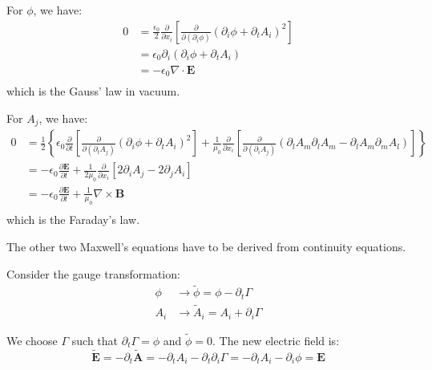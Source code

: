 \documentclass[12pt]{article}
\begin{document}
For $\phi$, we have:
\begin{equation}
    \begin{split}
        0 &= \frac{\epsilon_{0}}{2} \frac{\partial}{\partial x_{i}} \left[ \frac{\partial}{\partial (\partial_{i} \phi)} (\partial_{i} \phi + \partial_{t} A_{i})^{2} \right] \\
        &= \epsilon_{0} \partial_{i} (\partial_{i} \phi + \partial_{t} A_{i}) \\
        &=-\epsilon_{0} \nabla \cdot \mathbf{E} \\
    \end{split}
\end{equation}
which is the Gauss' law in vacuum.

For $A_{j}$, we have:
\begin{equation}
    \begin{split}
        0 &= \frac{1}{2} \left\{ \epsilon_{0} \frac{\partial}{\partial t} \left[ \frac{\partial}{\partial (\partial_{t} A_{j})} (\partial_{i} \phi + \partial_{t} A_{i})^{2} \right] + \frac{1}{\mu_{0}} \frac{\partial}{\partial x_{i}} \left[ \frac{\partial}{\partial (\partial_{i} A_{j})} (\partial_{l} A_{m} \partial_{l} A_{m} - \partial_{l} A_{m} \partial_{m} A_{l}) \right] \right\} \\
        &= -\epsilon_{0} \frac{\partial \mathbf{E}}{\partial t} + \frac{1}{2\mu_{0}} \frac{\partial }{\partial x_{i}} \left[ 2 \partial_{i} A_{j} - 2\partial_{j} A_{i} \right] \\
        &= -\epsilon_{0} \frac{\partial \mathbf{E}}{\partial t} + \frac{1}{\mu_{0}} \nabla \times \mathbf{B} \\
    \end{split}
\end{equation}
which is the Faraday's law.

The other two Maxwell's equations have to be derived from continuity equations.

Consider the gauge transformation:
\begin{equation}
    \begin{split}
        \phi &\to \tilde{\phi} = \phi - \partial_{t} \Gamma \\
        A_{i} &\to \tilde{A}_{i} = A_{i} + \partial_{i} \Gamma
    \end{split}
\end{equation}

We choose $\Gamma$ such that $\partial_{t} \Gamma = \phi$ and $\tilde{\phi} = 0$. The new electric field is:
\begin{equation}
    \tilde{\mathbf{E}} = -\partial_{t} \tilde{\mathbf{A}} = -\partial_{t} A_{i} - \partial_{t} \partial_{i} \Gamma = -\partial_{t} A_{i} - \partial_{i} \phi = \mathbf{E}
\end{equation}
\end{document}
